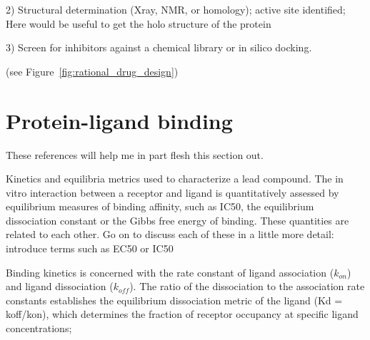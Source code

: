 2) Structural determination (Xray, NMR, or homology); active site identified; Here would be useful to get the holo structure of the protein

3) Screen for inhibitors against a chemical library or in silico docking.

(see Figure~\ref{fig:rational_drug_design})

\section{Protein-ligand binding}




These references will help me in part flesh this section out.\cite{Lu:2010jh,Kortagere:2010fc,Nunez:2012il,Copeland:2011dl,Prinz:2008kr,Sikazwe:2012gu,Copeland:2006bb}



Kinetics and equilibria metrics used to characterize a lead compound. The in vitro interaction between a receptor and ligand is quantitatively assessed by equilibrium measures of binding affinity, such as IC50, the equilibrium dissociation constant or the Gibbs free energy of binding. These quantities are related to each other.
Go on to discuss each of these in a little more detail:
introduce terms such as EC50 or IC50


Binding kinetics is concerned with the rate constant of ligand association ($k_{on}$) and ligand dissociation ($k_{off}$). The ratio of the dissociation to the association rate constants establishes the equilibrium dissociation metric of the ligand (Kd = koff/kon), which determines the fraction of receptor occupancy at specific ligand concentrations; 

